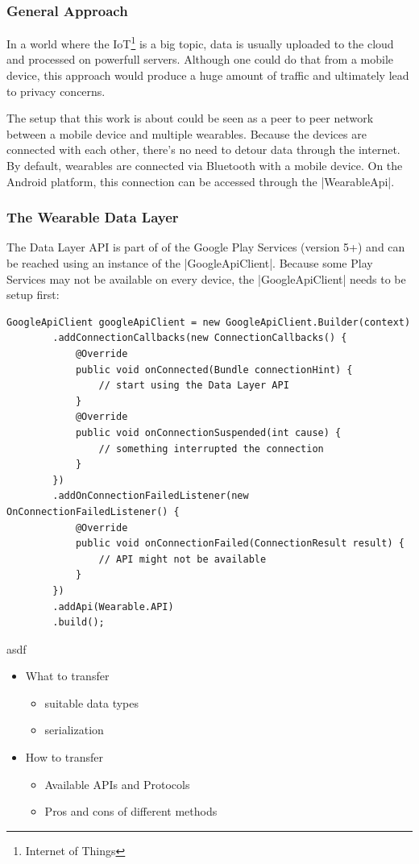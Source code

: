 \subsubsection{General Approach}
In a world where the IoT\footnote{Internet of Things} is a big topic, data is usually uploaded to the cloud and processed on powerfull servers.
Although one could do that from a mobile device, this approach would produce a huge amount of traffic and ultimately lead to privacy concerns.

The setup that this work is about could be seen as a peer to peer network between a mobile device and multiple wearables.
Because the devices are connected with each other, there's no need to detour data through the internet.
By default, wearables are connected via Bluetooth with a mobile device.
On the Android platform, this connection can be accessed through the |WearableApi|\cite{androiddocs:wearable}.

\subsubsection{The Wearable Data Layer}
The Data Layer API is part of of the Google Play Services (version 5+) and can be reached using an instance of the |GoogleApiClient|\cite{androiddocs:googleapiclient}.
Because some Play Services may not be available on every device, the |GoogleApiClient| needs to be setup first:

\begin{lstlisting}[label=googleapiclient]
GoogleApiClient googleApiClient = new GoogleApiClient.Builder(context)
		.addConnectionCallbacks(new ConnectionCallbacks() {
			@Override
			public void onConnected(Bundle connectionHint) {
				// start using the Data Layer API
			}
			@Override
			public void onConnectionSuspended(int cause) {
				// something interrupted the connection
			}
		})
		.addOnConnectionFailedListener(new OnConnectionFailedListener() {
			@Override
			public void onConnectionFailed(ConnectionResult result) {
				// API might not be available
			}
		})
		.addApi(Wearable.API)
		.build();
\end{lstlisting}

asdf

\begin{itemize}[noitemsep]
	\item What to transfer
		\begin{itemize}
			\item suitable data types
			\item serialization
		\end{itemize}
	\item How to transfer
		\begin{itemize}
			\item Available APIs and Protocols
			\item Pros and cons of different methods
		\end{itemize}
\end{itemize}
\lipsum[1]
\lipsum[2]
\lipsum[3]
\lipsum[4]
\lipsum[5]
\lipsum[1]
\lipsum[2]
\lipsum[3]
\lipsum[4]
\lipsum[5]
\lipsum[2]
\lipsum[3]
\lipsum[4]
\lipsum[5]


\clearpage